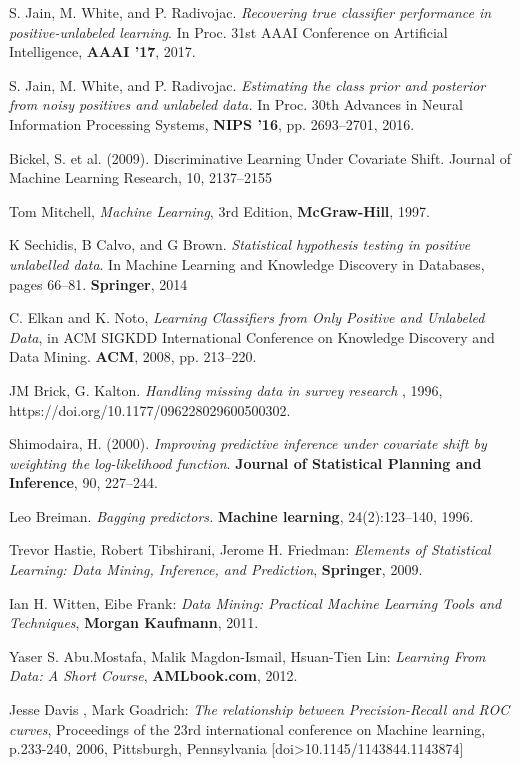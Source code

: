 \begin{thebibliography}{9}
S. Jain, M. White, and P. Radivojac. \textit{Recovering true classifier performance in positive-unlabeled learning}. In Proc. 31st AAAI Conference on Artificial Intelligence, \textbf{AAAI '17}, 2017.

S. Jain, M. White, and P. Radivojac. \textit{Estimating the class prior and posterior from noisy positives and unlabeled data.} In Proc. 30th Advances in Neural Information Processing Systems, \textbf{NIPS '16}, pp. 2693–2701, 2016.

Bickel, S. et al. (2009). Discriminative Learning Under Covariate Shift. Journal of Machine Learning Research, 10, 2137–2155

Tom Mitchell, \textit{Machine Learning}, 3rd Edition, \textbf{McGraw-Hill}, 1997.

K Sechidis, B Calvo, and G Brown. \textit{Statistical hypothesis testing in positive unlabelled data}. In Machine Learning and Knowledge Discovery in Databases, pages 66–81. \textbf{Springer}, 2014

C. Elkan and K. Noto, \textit{Learning Classifiers from Only Positive and Unlabeled Data}, in ACM SIGKDD International Conference on Knowledge Discovery and Data Mining. \textbf{ACM}, 2008, pp. 213–220.

JM Brick, G. Kalton. \textit{Handling missing data in survey research }, 1996, https://doi.org/10.1177/096228029600500302.

Shimodaira, H. (2000). \textit{Improving predictive inference under covariate shift by weighting the log-likelihood function}. \textbf{Journal of Statistical Planning and Inference}, 90, 227–244.

Leo Breiman. \textit{Bagging predictors.} \textbf{Machine learning}, 24(2):123–140, 1996.

Trevor Hastie, Robert Tibshirani, Jerome H. Friedman: \textit{Elements of Statistical Learning: Data Mining, Inference, and Prediction}, \textbf{Springer}, 2009.

Ian H. Witten, Eibe Frank: \textit{Data Mining: Practical Machine Learning Tools and Techniques}, \textbf{Morgan Kaufmann}, 2011.

Yaser S. Abu.Mostafa, Malik Magdon-Ismail, Hsuan-Tien Lin: \textit{Learning From Data: A Short Course}, \textbf{AMLbook.com}, 2012.

Jesse Davis , Mark Goadrich: \textit{The relationship between Precision-Recall and ROC curves}, Proceedings of the 23rd international conference on Machine learning, p.233-240, 2006, Pittsburgh, Pennsylvania  [doi>10.1145/1143844.1143874] 


\end{thebibliography}
